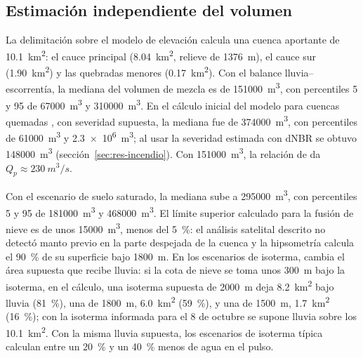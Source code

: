 \subsection{Estimación independiente del volumen}\label{sec:res-volumen}
La delimitación sobre el modelo de elevación calcula una cuenca aportante de \SI{10,1}{km^2}: el cauce principal (\SI{8,04}{km^2}, relieve de \SI{1376}{m}), el cauce sur (\SI{1,90}{km^2}) y las quebradas menores (\SI{0,17}{km^2}). Con el balance lluvia--escorrentía, la mediana del volumen de mezcla es de \SI{151000}{m^3}, con percentiles 5 y 95 de \SI{67000}{m^3} y \SI{310000}{m^3}. En el cálculo inicial del modelo para cuencas quemadas \citep{gartner2014}, con severidad supuesta, la mediana fue de \SI{374000}{m^3}, con percentiles de \SI{61000}{m^3} y \SI{2,3e6}{m^3}; al usar la severidad estimada con dNBR se obtuvo \SI{148000}{m^3} (sección~\ref{sec:res-incendio}). Con \SI{151000}{m^3}, la relación de \citet{mizuyama1992} da $Q_p\approx\SI{230}{m^3/s}$.

Con el escenario de suelo saturado, la mediana sube a \SI{295000}{m^3}, con percentiles 5 y 95 de \SI{181000}{m^3} y \SI{468000}{m^3}. El límite superior calculado para la fusión de nieve es de unos \SI{15000}{m^3}, menos del \SI{5}{\percent}: el análisis satelital descrito no detectó manto previo en la parte despejada de la cuenca y la hipsometría calcula el \SI{90}{\percent} de su superficie bajo \SI{1800}{m}. En los escenarios de isoterma, cambia el área supuesta que recibe lluvia: si la cota de nieve se toma unos \SI{300}{m} bajo la isoterma, en el cálculo, una isoterma supuesta de \SI{2000}{m} deja \SI{8,2}{km^2} bajo lluvia (\SI{81}{\percent}), una de \SI{1800}{m}, \SI{6,0}{km^2} (\SI{59}{\percent}), y una de \SI{1500}{m}, \SI{1,7}{km^2} (\SI{16}{\percent}); con la isoterma informada para el 8 de octubre se supone lluvia sobre los \SI{10,1}{km^2}. Con la misma lluvia supuesta, los escenarios de isoterma típica calculan entre un \SI{20}{\percent} y un \SI{40}{\percent} menos de agua en el pulso.

